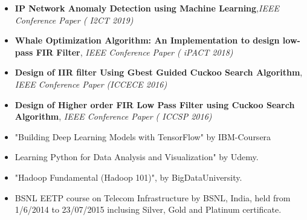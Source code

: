 
\begin{itemize}[label=\textcolor{blue}{\textbullet}]
    \item \textbf{IP Network Anomaly Detection using Machine Learning},\textit{IEEE Conference Paper ( I2CT 2019)} 
    \href{https://ieeexplore.ieee.org/document/9033545}{}
    
    \item \textbf{Whale Optimization Algorithm: An Implementation to design low-pass FIR Filter}, \textit{IEEE Conference Paper ( iPACT 2018)}
     \href{https://ieeexplore.ieee.org/document/8244929}{}


  \item \textbf{Design of IIR filter Using Gbest Guided Cuckoo Search Algorithm}, \textit{IEEE Conference Paper (ICCECE 2016)}
  \href{https://ieeexplore.ieee.org/document/8009573/}{}
  
 \item \textbf{Design of Higher order FIR Low Pass Filter using Cuckoo Search Algorithm},\textit{ IEEE Conference Paper ( ICCSP 2016)}
   \href{https://ieeexplore.ieee.org/document/7754285}{}

 

   
\end{itemize}
\begin{itemize}[label=\textcolor{blue}{\textbullet}]
    \item "Building Deep Learning Models with TensorFlow" by IBM-Coursera 
    \href{https://www.coursera.org/account/accomplishments/certificate/75EQAGRGFR58}{}
    \item Learning Python for Data Analysis and Visualization" by Udemy.
    \href{https://www.udemy.com/certificate/UC-HW46HMZQ/}{}
 
    \item "Hadoop Fundamental (Hadoop 101)", by BigDataUniversity.
    \href{https://www.youracclaim.com/badges/e67a79d9-b218-4f66-92c3-93ae91eee7b2}{}
    \item BSNL EETP course on Telecom Infrastructure by BSNL, India, held from 1/6/2014 to 23/07/2015 inclusing Silver, Gold and Platinum certificate. 
    
\end{itemize}






{}




